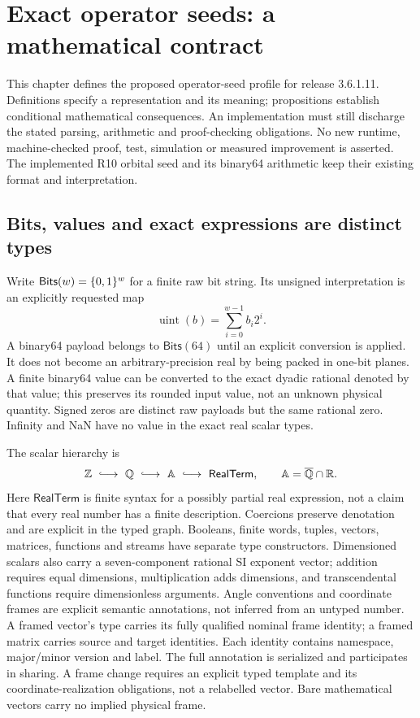 \section{Exact operator seeds: a mathematical contract}
\label{sec:exact-core}
This chapter defines the proposed  operator-seed profile for
release 3.6.1.11. Definitions specify a representation and its meaning;
propositions establish conditional mathematical consequences. An implementation
must still discharge the stated parsing, arithmetic and proof-checking
obligations. No new runtime, machine-checked proof, test, simulation or measured
improvement is asserted. The implemented R10 orbital seed and its binary64
arithmetic keep their existing format and interpretation.

\subsection{Bits, values and exact expressions are distinct types}
Write $\mathsf{Bits}(w)=\{0,1\}^w$ for a finite raw bit string. Its unsigned
interpretation is an explicitly requested map
\[
 \operatorname{uint}(b)=\sum_{i=0}^{w-1}b_i2^i.
\]
A binary64 payload belongs to $\mathsf{Bits}(64)$ until an explicit conversion
is applied. It does not become an arbitrary-precision real by being packed in
one-bit planes. A finite binary64 value can be converted to the exact dyadic
rational denoted by that value; this preserves its rounded input value, not an
unknown physical quantity. Signed zeros are distinct raw payloads but the same
rational zero. Infinity and NaN have no value in the exact real scalar types.

The scalar hierarchy is
\[
 \Z\ \lhook\joinrel\longrightarrow\ \mathbb Q
 \ \lhook\joinrel\longrightarrow\ \mathbb A
 \ \lhook\joinrel\longrightarrow\ \mathsf{RealTerm},
 \qquad \mathbb A=\overline{\mathbb Q}\cap\R.
\]
Here $\mathsf{RealTerm}$ is finite syntax for a possibly partial real expression,
not a claim that every real number has a finite description. Coercions preserve
denotation and are explicit in the typed graph. Booleans, finite words, tuples,
vectors, matrices, functions and streams have separate type constructors.
Dimensioned scalars also carry a seven-component rational SI exponent vector;
addition requires equal dimensions, multiplication adds dimensions, and
transcendental functions require dimensionless arguments. Angle conventions and
coordinate frames are explicit semantic annotations, not inferred from an
untyped number. A framed vector's type carries its fully qualified nominal frame
identity; a framed matrix carries source and target identities. Each identity
contains namespace, major/minor version and label. The full annotation is
serialized and participates in sharing. A frame change requires an explicit
typed template and its coordinate-realization obligations, not a relabelled
vector. Bare mathematical vectors carry no implied physical frame.

